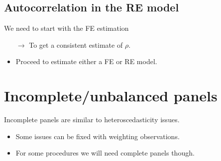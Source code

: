 \begin{multicols}{2}
\subsection{Autocorrelation in the RE model}
We need to start with the FE estimation
\begin{itemize}
  \item[$\rightarrow$] To get a consistent estimate of $\rho$.
  \item Proceed to estimate either a FE or RE model.
\end{itemize}


\end{multicols}



\section{Incomplete/unbalanced panels} %
\begin{multicols}{2}
Incomplete panels are similar to heteroscedasticity issues.
\begin{itemize}
  \item Some issues can be fixed with weighting observations.
  \item For some procedures we will need complete panels though.
\end{itemize}

\end{multicols}


